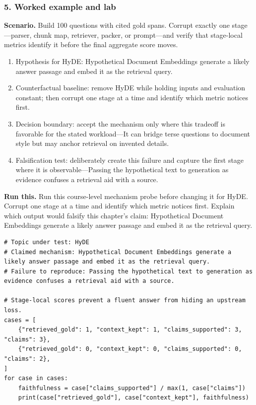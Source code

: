 \subsubsection*{5. Worked example and lab}
\textbf{Scenario.} Build 100 questions with cited gold spans. Corrupt exactly one stage—parser, chunk map, retriever, packer, or prompt—and verify that stage-local metrics identify it before the final aggregate score moves.
\begin{enumerate}
\item Hypothesis for HyDE: Hypothetical Document Embeddings generate a likely answer passage and embed it as the retrieval query.
\item Counterfactual baseline: remove HyDE while holding inputs and evaluation constant; then corrupt one stage at a time and identify which metric notices first.
\item Decision boundary: accept the mechanism only where this tradeoff is favorable for the stated workload—It can bridge terse questions to document style but may anchor retrieval on invented details.
\item Falsification test: deliberately create this failure and capture the first stage where it is observable—Passing the hypothetical text to generation as evidence confuses a retrieval aid with a source.
\end{enumerate}
\textbf{Run this.} Run this course-level mechanism probe before changing it for HyDE. Corrupt one stage at a time and identify which metric notices first. Explain which output would falsify this chapter's claim: Hypothetical Document Embeddings generate a likely answer passage and embed it as the retrieval query.
\begin{Verbatim}[fontsize=\scriptsize]
# Topic under test: HyDE
# Claimed mechanism: Hypothetical Document Embeddings generate a likely answer passage and embed it as the retrieval query.
# Failure to reproduce: Passing the hypothetical text to generation as evidence confuses a retrieval aid with a source.

# Stage-local scores prevent a fluent answer from hiding an upstream loss.
cases = [
    {"retrieved_gold": 1, "context_kept": 1, "claims_supported": 3, "claims": 3},
    {"retrieved_gold": 0, "context_kept": 0, "claims_supported": 0, "claims": 2},
]
for case in cases:
    faithfulness = case["claims_supported"] / max(1, case["claims"])
    print(case["retrieved_gold"], case["context_kept"], faithfulness)
\end{Verbatim}
